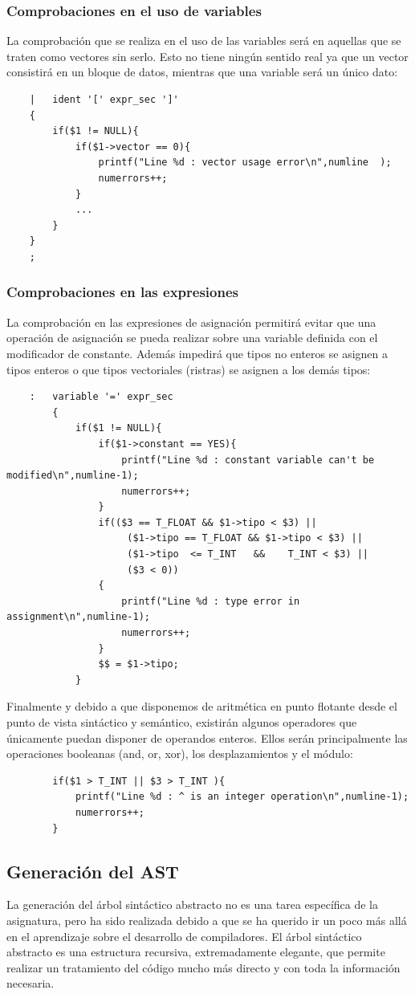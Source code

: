\documentclass[a4paper,10pt]{article}
\begin{document}
\subsubsection{Comprobaciones en el uso de variables}
La comprobación que se realiza en el uso de las variables será en aquellas que se traten como vectores sin serlo. Esto no tiene ningún sentido real ya que un vector consistirá en un bloque de datos, mientras que una variable será un único dato:

\begin{lstlisting}
	|	ident '[' expr_sec ']'
	{
		if($1 != NULL){
			if($1->vector == 0){
				printf("Line %d : vector usage error\n",numline  );
				numerrors++;
			}
			...
		}
	}
	;
\end{lstlisting}
\subsubsection{Comprobaciones en las expresiones}

La comprobación en las expresiones de asignación permitirá evitar que una operación de asignación se pueda realizar sobre una variable definida con el modificador de constante. Además impedirá que tipos no enteros se asignen a tipos enteros o que tipos vectoriales (ristras) se asignen a los demás tipos:

\begin{lstlisting}
	:	variable '=' expr_sec 
		{
			if($1 != NULL){
				if($1->constant == YES){
					printf("Line %d : constant variable can't be modified\n",numline-1);
					numerrors++;
				}
				if(($3 == T_FLOAT && $1->tipo < $3) || 
					 ($1->tipo == T_FLOAT && $1->tipo < $3) ||
					 ($1->tipo  <= T_INT   &&    T_INT < $3) ||  
					 ($3 < 0))
				{
					printf("Line %d : type error in assignment\n",numline-1);
					numerrors++;
				} 
				$$ = $1->tipo;
			}
\end{lstlisting}

Finalmente y debido a que disponemos de aritmética en punto flotante desde el punto de vista sintáctico y semántico, existirán algunos operadores que únicamente puedan disponer de operandos enteros. Ellos serán principalmente las operaciones booleanas (and, or, xor), los desplazamientos y el módulo:
\begin{lstlisting}
		if($1 > T_INT || $3 > T_INT ){
			printf("Line %d : ^ is an integer operation\n",numline-1);
			numerrors++;
		} 
\end{lstlisting}


\subsection{Generación del AST}
La generación del árbol sintáctico abstracto no es una tarea específica de la asignatura, pero ha sido realizada debido a que se ha querido ir un poco más allá en el aprendizaje sobre el desarrollo de compiladores. El árbol sintáctico abstracto es una estructura recursiva, extremadamente elegante, que permite realizar un tratamiento del código mucho más directo y con toda la información necesaria. 
\end{document}
